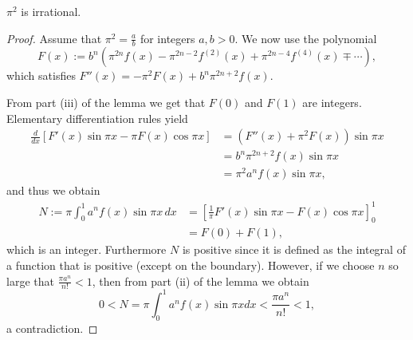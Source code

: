 \begin{theorem}
  \label{pi_pow_2_irrational}
  \label{book.irrational.Theorem_2}
  \leanok
  $\pi^2$ is irrational.
\end{theorem}
\begin{proof}
  Assume that $\pi^2 = \frac{a}{b}$ for integers $a, b > 0$.
  We now use the polynomial
  \[
  F(x) := b^n \left( \pi^{2n} f(x) - \pi^{2n-2} f^{(2)}(x) + \pi^{2n-4} f^{(4)}(x) \mp \cdots \right),
  \]
  which satisfies $F''(x) = -\pi^2 F(x) + b^n \pi^{2n+2} f(x)$.
  
  From part (iii) of the lemma we get that $F(0)$ and $F(1)$ are integers.
  Elementary differentiation rules yield
  \begin{align*}
  \frac{d}{dx} [F'(x) \sin \pi x - \pi F(x) \cos \pi x] &= \left(F''(x) + \pi^2 F(x)\right) \sin \pi x \\
  &= b^n \pi^{2n+2} f(x) \sin \pi x \\
  &= \pi^2 a^n f(x) \sin \pi x,
  \end{align*}
  and thus we obtain
  \begin{align*}
  N := \pi \int_0^1 a^n f(x) \sin \pi x \, dx &= \left[ \frac{1}{\pi} F'(x) \sin \pi x - F(x) \cos \pi x \right]_0^1 \\
  &= F(0) + F(1),
  \end{align*}
  which is an integer.
  Furthermore $N$ is positive since it is defined as the integral of a function that is positive (except on the boundary).
  However, if we choose $n$ so large that $\frac{\pi a^n}{n!} < 1$, then from part (ii) of the lemma we obtain
  \[
  0 < N = \pi \int_0^1 a^n f(x) \sin \pi x dx < \frac{\pi a^n}{n!} < 1,
  \]
  a contradiction.
\end{proof}

